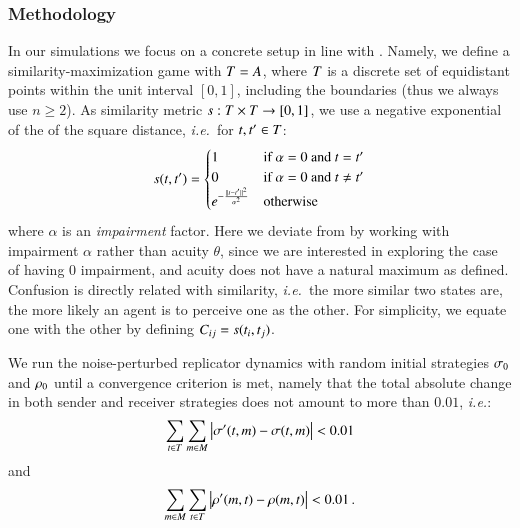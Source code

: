 \subsubsection{Methodology}
\newcommand{\impairment}{\alpha}
In our simulations we focus on a concrete setup in line with \cite{Correia2013:The-Bivalent-Tr}.
Namely, we define a similarity-maximization game with $T = A$, where $T$ is a discrete set of equidistant points within the unit interval $[0,1]$, including the boundaries (thus we always use $n \geq 2$).
As similarity metric $s:T \times T \rightarrow [0,1]$, we use a negative exponential of the of the square distance, \emph{i.e.}~for $t,t^\prime \in T$:
\begin{align*}
  s(\state,\state^\prime) =
    \begin{cases}
    1 & \textrm{if } \impairment = 0 \textrm{ and } \state = \state^\prime \\
    0 & \textrm{if } \impairment = 0 \textrm{ and } \state \neq \state^\prime \\
    e^{-\frac{\lVert \state - \state^\prime \rVert ^2}{\impairment^2}} & \textrm{otherwise} \\
    \end{cases}
\end{align*}
where $\impairment$ is an \emph{impairment} factor.
Here we deviate from \cite{Correia2013:The-Bivalent-Tr} by working with impairment $\impairment$ rather than acuity $\theta$, since we are interested in exploring the case of having $0$ impairment, and acuity does not have a natural maximum as defined.
Confusion is directly related with similarity, \emph{i.e.}~the more similar two states are, the more likely an agent is to perceive one as the other.
For simplicity, we equate one with the other by defining $C_{ij} = s(t_i,t_j)$.

We run the noise-perturbed replicator dynamics with random initial strategies $\sigma_0$ and $\rho_0$ until a convergence criterion is met, namely that the total absolute change in both sender and receiver strategies does not amount to more than $0.01$, \emph{i.e.}:
\begin{align*}
  \sum_{t \in T} \sum_{m \in M} \left| \sigma^\prime(t,m) - \sigma(t,m) \right| < 0.01
\end{align*}
and
\begin{align*}
  \sum_{m \in M} \sum_{t \in T} \left| \rho^\prime(m,t) - \rho(m,t) \right| < 0.01 \,.
\end{align*}

